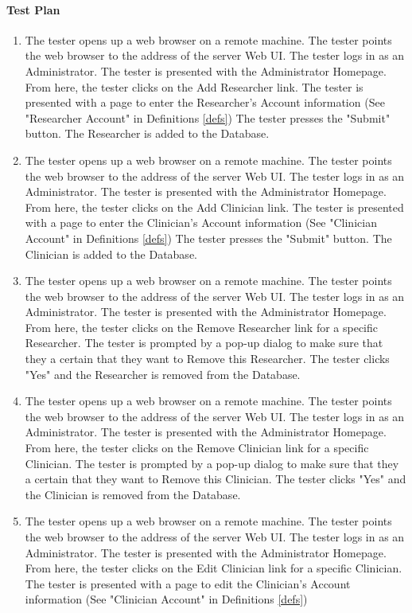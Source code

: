 \documentclass{article}
\begin{document}
\paragraph {Test Plan}
\begin{enumerate}
\item The tester opens up a web browser on a remote machine. The tester points the web browser to the address of the server Web UI. The tester logs in as an Administrator. The tester is presented with the Administrator Homepage. From here, the tester clicks on the Add Researcher link. The tester is presented with a page to enter the Researcher's Account information (See "Researcher Account" in Definitions \ref{defs})
The tester presses the "Submit" button. The Researcher is added to the Database.
\item The tester opens up a web browser on a remote machine. The tester points the web browser to the address of the server Web UI. The tester logs in as an Administrator. The tester is presented with the Administrator Homepage. From here, the tester clicks on the Add Clinician link. The tester is presented with a page to enter the Clinician's Account information (See "Clinician Account" in Definitions \ref{defs})
The tester presses the "Submit" button. The Clinician is added to the Database.
\item The tester opens up a web browser on a remote machine. The tester points the web browser to the address of the server Web UI. The tester logs in as an Administrator. The tester is presented with the Administrator Homepage. From here, the tester clicks on the Remove Researcher link for a specific Researcher. The tester is prompted by a pop-up dialog to make sure that they a certain that they want to Remove this Researcher. The tester clicks "Yes" and the Researcher is removed from the Database. 
\item The tester opens up a web browser on a remote machine. The tester points the web browser to the address of the server Web UI. The tester logs in as an Administrator. The tester is presented with the Administrator Homepage. From here, the tester clicks on the Remove Clinician link for a specific Clinician. The tester is prompted by a pop-up dialog to make sure that they a certain that they want to Remove this Clinician. The tester clicks "Yes" and the Clinician is removed from the Database. 
\item The tester opens up a web browser on a remote machine. The tester points the web browser to the address of the server Web UI. The tester logs in as an Administrator. The tester is presented with the Administrator Homepage. From here, the tester clicks on the Edit Clinician link for a specific Clinician. The tester is presented with a page to edit the Clinician's Account information (See "Clinician Account" in Definitions \ref{defs})

\end{enumerate}
\end{document}
